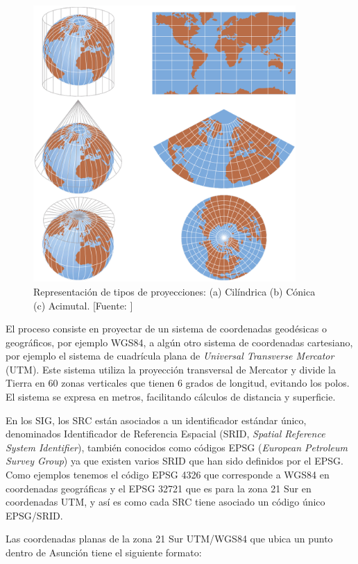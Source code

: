 \begin{figure}[H]
    \centering
    \includegraphics[width=10cm]{Chapter3/Chapter3Figs/CoordenadasProyectadas.png}
    \caption{Representación de tipos de proyecciones: (a) Cilíndrica (b) Cónica (c) Acimutal. [Fuente: ]}
    \label{fig:mapaCoordenadasGeograficas}
\end{figure}

El proceso consiste en proyectar de un sistema de coordenadas geodésicas o geográficos, por ejemplo WGS84, a algún otro sistema de coordenadas cartesiano, por ejemplo el sistema de cuadrícula plana de \textit{Universal Transverse Mercator} (UTM). Este sistema utiliza la proyección transversal de Mercator y divide la Tierra en 60 zonas verticales que tienen 6 grados de longitud, evitando los polos. El sistema se expresa en metros, facilitando cálculos de distancia y superficie.

En los SIG, los SRC están asociados a un identificador estándar único, denominados Identificador de Referencia Espacial (SRID, \textit{Spatial Reference System Identifier}), también conocidos como códigos EPSG (\textit{European Petroleum Survey Group}) ya que existen varios SRID que han sido definidos por el EPSG. Como ejemplos tenemos el código EPSG 4326 que corresponde a WGS84 en coordenadas geográficas y el EPSG 32721 que es para la zona 21 Sur en coordenadas UTM, y así es como cada SRC tiene asociado un código único EPSG/SRID.

Las coordenadas planas de la zona 21 Sur UTM/WGS84 que ubica un punto dentro de Asunción tiene el siguiente formato:

